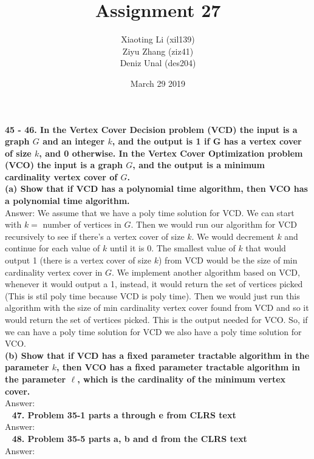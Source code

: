 \documentclass{article}
\title{Assignment 27}
\author{Xiaoting Li (xil139) \\
Ziyu Zhang (ziz41) \\
Deniz Unal (des204)}
\date{March 29 2019}
\begin{document}
\maketitle
\noindent
\textbf{45 - 46. In the Vertex Cover Decision problem (VCD) the input is a graph $G$ and an integer $k$, and the output is 1 if G has a vertex cover of size $k$, and 0 otherwise. In the Vertex Cover Optimization problem (VCO) the input is a graph $G$, and the output is a minimum cardinality vertex cover of $G$.} \\ \newline
\textbf{(a) Show that if VCD has a polynomial time algorithm, then VCO has a polynomial time algorithm.} \\ \newline
Answer: We assume that we have a poly time solution for VCD. We can start with $k =$ number of vertices in $G$. Then we would run our algorithm for VCD recursively to see if there's a vertex cover of size $k$. We would decrement $k$ and continue for each value of $k$ until it is 0. The smallest value of $k$ that would output 1 (there is a vertex cover of size $k$) from VCD would be the size of min cardinality vertex cover in $G$. We implement another algorithm based on VCD, whenever it would output a 1, instead, it would return the set of vertices picked (This is stil poly time because VCD is poly time). Then we would just run this algorithm with the size of min cardinality vertex cover found from VCD and so it would return the set of vertices picked. This is the output needed for VCO. So, if we can have a poly time solution for VCD we also have a poly time solution for VCO.\\ \newline
\textbf{(b) Show that if VCD has a fixed parameter tractable algorithm in the parameter $k$, then VCO has a fixed parameter tractable algorithm in the parameter $\ell$, which is the cardinality of the minimum vertex cover.} \\ \newline
Answer: \\ \newline
\textbf{47. Problem 35-1 parts a through e from CLRS text} \\ \newline
Answer: \\ \newline
\textbf{48. Problem 35-5 parts a, b and d from the CLRS text} \\ \newline
Answer: \\ \newline
\end{document}
